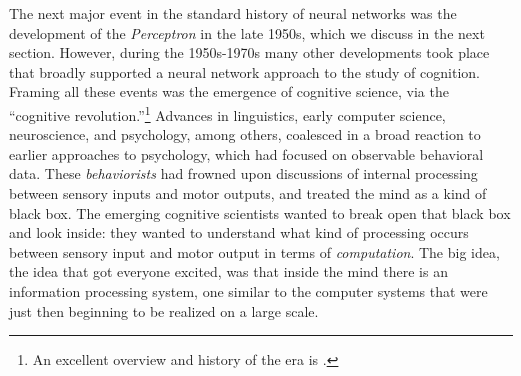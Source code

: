 The next major event in the standard history of neural networks was the development of the \emph{Perceptron} in the late 1950s, which we discuss in the next section. However, during the 1950s-1970s many other developments took place that broadly supported a neural network approach to the study of cognition. Framing all these events was the emergence of cognitive science, via the ``cognitive revolution.''\footnote{An excellent overview and history of the era is \cite{baars1986cognitive}.}  Advances in linguistics, early computer science, neuroscience, and psychology, among others, coalesced in a broad reaction to earlier approaches to psychology, which had focused on observable behavioral data. These \emph{behaviorists} had frowned upon discussions of internal processing between sensory inputs and motor outputs, and treated the mind as a kind of black box. The emerging cognitive scientists wanted to break open that black box and look inside: they wanted to understand what kind of processing occurs between sensory input and motor output in terms of \emph{computation}. The big idea, the idea that got everyone excited, was that inside the mind there is an information processing system, one similar to the computer systems that were just then beginning to be realized on a large scale. 




